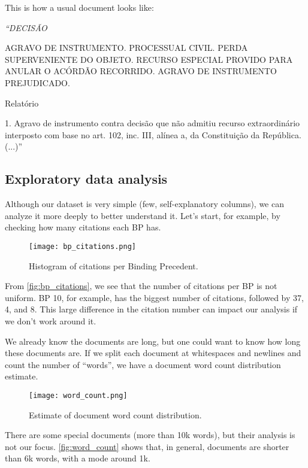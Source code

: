             This is how a usual document looks like:

            \bigskip

            {\itshape``DECISÃO

            AGRAVO DE INSTRUMENTO. PROCESSUAL CIVIL. PERDA SUPERVENIENTE DO OBJETO. RECURSO ESPECIAL PROVIDO PARA ANULAR O ACÓRDÃO RECORRIDO. AGRAVO DE INSTRUMENTO PREJUDICADO.

            Relatório

            1. Agravo de instrumento contra decisão que não admitiu recurso extraordinário interposto com base no art. 102, inc. III, alínea a, da Constituição da República. (...)''}

      \subsection{Exploratory data analysis}

            Although our dataset is very simple (few, self-explanatory columns), we can analyze it more deeply to better understand it. Let's start, for example, by checking how many citations each BP has.

            \begin{figure}[H]
                  \texttt{[image: bp\_citations.png]}
                  \caption{Histogram of citations per Binding Precedent.}
                  \label{fig:bp_citations}
            \end{figure}

            From \autoref{fig:bp_citations}, we see that the number of citations per BP is not uniform. BP 10, for example, has the biggest number of citations, followed by 37, 4, and 8. This large difference in the citation number can impact our analysis if we don't work around it.

            We already know the documents are long, but one could want to know how long these documents are. If we split each document at whitespaces and newlines and count the number of ``words'', we have a document word count distribution estimate.

            \begin{figure}[H]
                  \texttt{[image: word\_count.png]}
                  \caption{Estimate of document word count distribution.}
                  \label{fig:word_count}
            \end{figure}

            There are some special documents (more than 10k words), but their analysis is not our focus. \autoref{fig:word_count} shows that, in general, documents are shorter than 6k words, with a mode around 1k.

